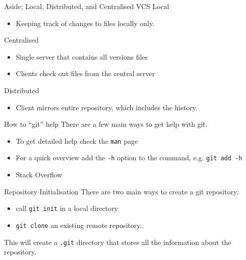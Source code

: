 \documentclass{beamer}
\begin{document}
\begin{frame}{Aside: Local, Distributed, and Centralised VCS}
    Local
    \begin{itemize}
        \item Keeping track of changes to files locally only.
    \end{itemize}
    Centralised
    \begin{itemize}
        \item Single server that contains all versions files
        \item Clients check out files from the central server
    \end{itemize}
    Distributed
    \begin{itemize}
        \item Client mirrors entire repository, which includes the history.
    \end{itemize}
\end{frame}

\begin{frame}{How to ``git'' help}
There are a few main ways to get help with git.
\begin{itemize}
    \item To get detailed help check the \texttt{man} page
    \item For a quick overview add the \texttt{-h} option to the command, e.g. \texttt{git add -h}
    \item Stack Overflow
\end{itemize}
\end{frame}

\begin{frame}{Repository Initialisation}
There are two main ways to create a git repository:
\begin{itemize}
    \item call \texttt{git init} in a local directory
    \item \texttt{git clone} an existing remote repository..
\end{itemize}
This will create a \texttt{.git} directory that stores all the information about the repository. 
\end{frame}
\end{document}

